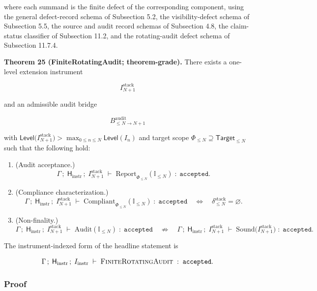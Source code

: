 \documentclass[11pt]{article}
\providecommand{\tightlist}{}
\theoremstyle{definition}
\begin{document}
where each summand is the finite defect of the corresponding component, using the general defect-record schema of Subsection 5.2, the visibility-defect schema of Subsection 5.5, the source and audit record schemas of Subsection 4.8, the claim-status classifier of Subsection 11.2, and the rotating-audit defect schema of Subsection 11.7.4.

\textbf{Theorem 25 (FiniteRotatingAudit; theorem-grade).} There exists a one-level extension instrument

\[
I_{N+1}^{\mathrm{stack}}
\]

and an admissible audit bridge

\[
B^{\mathrm{audit}}_{\le N\to N+1}
\]

with \(\mathsf{Level}\bigl(I_{N+1}^{\mathrm{stack}}\bigr)>\max_{0\le n\le N}\mathsf{Level}(I_n)\) and target scope \(\Phi_{\le N}\supseteq\mathsf{Target}_{\le N}\) such that the following hold:

\begin{enumerate}
\def\labelenumi{\arabic{enumi}.}
\tightlist
\item
  (Audit acceptance.)
  \[
  \Gamma\,;\;\mathsf H_{\mathrm{instr}}\,;\;I_{N+1}^{\mathrm{stack}}\;\vdash\;\mathrm{Report}_{\Phi_{\le N}}(\mathbb I_{\le N})\;:\;\texttt{accepted}.
  \]
\item
  (Compliance characterization.)
  \[
  \Gamma\,;\;\mathsf H_{\mathrm{instr}}\,;\;I_{N+1}^{\mathrm{stack}}\;\vdash\;\mathrm{Compliant}_{\Phi_{\le N}}(\mathbb I_{\le N})\;:\;\texttt{accepted}\quad\Longleftrightarrow\quad\delta_{\le N}^{\mathrm{stack}}=\varnothing.
  \]
\item
  (Non-finality.)
  \[
  \Gamma\,;\;\mathsf H_{\mathrm{instr}}\,;\;I_{N+1}^{\mathrm{stack}}\;\vdash\;\mathrm{Audit}(\mathbb I_{\le N})\;:\;\texttt{accepted}\quad\not\Longrightarrow\quad\Gamma\,;\;\mathsf H_{\mathrm{instr}}\,;\;I_{N+1}^{\mathrm{stack}}\;\vdash\;\mathrm{Sound}\bigl(I_{N+1}^{\mathrm{stack}}\bigr)\;:\;\texttt{accepted}.
  \]
\end{enumerate}

The instrument-indexed form of the headline statement is

\[
\Gamma\,;\;\mathsf H_{\mathrm{instr}}\,;\;I_{\mathrm{instr}}\;\vdash\;\textsc{FiniteRotatingAudit}\;:\;\texttt{accepted}.
\]

\subsubsection{Proof}
\end{document}
